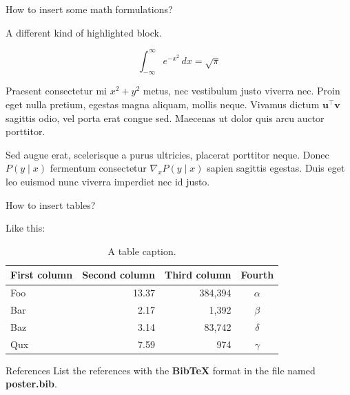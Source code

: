 \documentclass{article}
\begin{document}
\begin{frame}[t]
\begin{columns}[t]
\separatorcolumn

\begin{column}{\colwidth}

  \begin{exampleblock}{How to insert some math formulations?}

    A different kind of highlighted block.

    $$
    \int_{-\infty}^{\infty} e^{-x^2}\,dx = \sqrt{\pi}
    $$


    Praesent consectetur mi $x^2 + y^2$ metus, nec vestibulum justo viverra
    nec. Proin eget nulla pretium, egestas magna aliquam, mollis neque. Vivamus
    dictum $\mathbf{u}^\intercal\mathbf{v}$ sagittis odio, vel porta erat
    congue sed. Maecenas ut dolor quis arcu auctor porttitor.


    Sed augue erat, scelerisque a purus ultricies, placerat porttitor neque.
    Donec $P(y \mid x)$ fermentum consectetur $\nabla_x P(y \mid x)$ sapien
    sagittis egestas. Duis eget leo euismod nunc viverra imperdiet nec id
    justo.

  \end{exampleblock}

  \begin{block}{How to insert tables?}

    Like this:

    \begin{table}
      \centering
      \begin{tabular}{l r r c}
        \toprule
        \textbf{First column} & \textbf{Second column} & \textbf{Third column} & \textbf{Fourth} \\
        \midrule
        Foo & 13.37 & 384,394 & $\alpha$ \\
        Bar & 2.17 & 1,392 & $\beta$ \\
        Baz & 3.14 & 83,742 & $\delta$ \\
        Qux & 7.59 & 974 & $\gamma$ \\
        \bottomrule
      \end{tabular}
      \caption{A table caption.}
    \end{table}



  \end{block}

  \begin{block}{References}
List the references with the \textbf{BibTeX} format in the file named \textbf{poster.bib}.
    \nocite{*}
    \footnotesize{}

  \end{block}

\end{column}

\separatorcolumn
\end{columns}
\end{frame}
\end{document}
